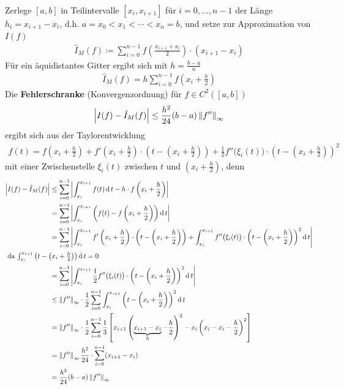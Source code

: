 \label{im7.1.2}
Zerlege $[a,b]$ in Teilintervalle $[x_i,x_{i+1}]$
für $i=0,\dotsc,n-1$ der Länge $h_i=x_{i+1}-x_i$, d.h.
$a=x_0 < x_1 < \dotsb < x_n = b$,
und setze zur Approximation von $I(f)$
\begin{gather}
  \hat{I}_M(f) \coloneqq \sum_{i=0}^{n-1}f\left(
    \frac{x_{i+1}+x_i}{2}
  \right)
  \cdot (x_{i+1}-x_i)
  \label{VII.1.3}
\end{gather}
Für ein äquidistantes Gitter ergibt sich mit $h=\frac{b-a}{n}$
\begin{gather}
  \hat{I}_M(f)= h \sum_{i=0}^{n-1}f\left(
    x_{i}+\frac{h}{2}
  \right)
  \label{VII.1.4}
\end{gather}
Die \textbf{Fehlerschranke}
(Konvergenzordnung) für $f\in C^2([a,b])$
\begin{gather}
  \left| I(f) -\hat{I}_M(f)\right|
  \leq \frac{h^2}{24}(b-a)\nn[f'']_\infty
  \label{VII.1.5}
\end{gather}
ergibt sich aus der Taylorentwicklung
\begin{gather*}
  f(t) = f\left(x_i+\frac{h}{2}\right)
  + f'\left(x_i+\frac{h}{2}\right) \cdot 
  \left(t-\left(x_i+\frac{h}{2}\right)\right)
  + \frac{1}{2}f''\big(\xi_i(t)\big)\cdot
  \left(t-\left(x_i+\frac{h}{2}\right)\right)^2
\end{gather*}
mit einer Zwischenstelle $\xi_i(t)$ zwischen $t$ und
$\left(x_i+\frac{h}{2}\right)$, denn
\begin{align*}
  \left|I(f)-\hat{I}_M(f)\right|
  &\leq \sum_{i=0}^{n-1} \left|
    \int_{x_i}^{x_{i+1}}f(t)\dd t - h\cdot f\left(x_i+\frac{h}{2}\right)
    \right|\\
  &=\sum_{i=0}^{n-1} \left|
    \int_{x_i}^{x_{i+1}}\left( 
    f(t) - f\left(x_i+\frac{h}{2}\right)
    \right) \dd t
    \right|\\
  &= \sum_{i=0}^{n-1} \left|
    \int_{x_i}^{x_{i+1}}
    f'\left(x_i+\frac{h}{2}\right) \cdot 
    \left(t-\left(x_i+\frac{h}{2}\right)\right)
    + \int_{x_i}^{x_{i+1}}
    f''\big(\xi_i(t)\big)
    \cdot \left(t-\left(x_i+\frac{h}{2}\right)\right)^2\dd t
      \right|\\
  \intertext{
    da $\int_{x_i}^{x_{i+1}}\left(
    t-\left(x_i+\frac{h}{2}\right)
    \right)\dd t=0$
    }
  &= \sum_{i=0}^{n-1} \left|
    \int_{x_i}^{x_{i+1}}
    \frac{1}{2} f''\big(\xi_i(t)\big)
    \cdot \left(t-\left(x_i+\frac{h}{2}\right)\right)^2\dd t
    \right|\\
  &\leq \nn[f'']_\infty \cdot \frac{1}{2}
    \sum_{i=0}^{n-1}
    \int_{x_i}^{x_{i+1}}
    \left(t-\left(x_i+\frac{h}{2}\right)\right)^2\dd t\\
  &= \nn[f'']_\infty \cdot \frac{1}{2}
    \sum_{i=0}^{n-1}
    \frac{1}{3}\left[
    x_{i+1}\left(\underbrace{x_{i+1}-x_i}_{h}-\frac{h}{2}\right)^2
    - x_{i}\left(x_{i}  -x_i-\frac{h}{2}\right)^2
    \right]\\
  &= \nn[f'']_\infty \frac{h^2}{24}
    \cdot \sum_{i=0}^{n-1} (x_{i+1}-x_i)\\
  &=\frac{h^2}{24} (b-a)\nn[f'']_\infty
\end{align*}
